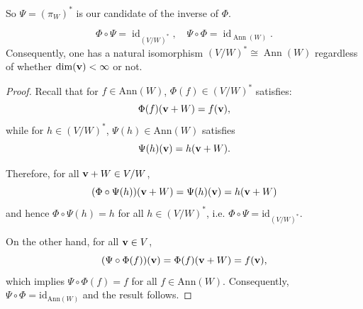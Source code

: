 So $\Psi = (\pi_W)^*$ is our candidate of the inverse of $\Phi$. 


\begin{theorem}
\[
\Phi \circ \Psi = \operatorname{id}_{(V/W)^*}, \quad \Psi \circ \Phi = \operatorname{id}_{\operatorname{Ann}(W)}.
\]
Consequently, one has a natural isomorphism $(V/W)^* \cong \operatorname{Ann}(W)$ regardless of whether $\dim({\bf v}) < \infty$ or not.
\end{theorem}
\begin{proof}
    Recall that for $f \in \mathrm{Ann}(W)$, $\Phi(f) \in (V/W)^*$ satisfies:
    $$\Phi(f)({\bf v}+W) = f({\bf v}),$$ 
    while for $h \in (V/W)^*$, $\Psi(h) \in \mathrm{Ann}(W)$ satisfies
    $$\Psi(h)({\bf v}) = h({\bf v}+W).$$

    Therefore, for all ${\bf v} +W \in V/W$,
    $$(\Phi \circ \Psi(h))({\bf v} + W) = \Psi(h)({\bf v}) = h({\bf v}+W)$$
    and hence $\Phi \circ \Psi(h) = h$ for all $h \in (V/W)^*$, i.e. $\Phi \circ \Psi = \mathrm{id}_{(V/W)^*}$.

    On the other hand, for all ${\bf v} \in V$,
    $$(\Psi \circ \Phi(f))({\bf v}) = \Phi(f)({\bf v} + W) = f({\bf v}),$$
    which implies $\Psi \circ \Phi(f) = f$ for all $f \in \mathrm{Ann}(W)$. Consequently, $\Psi \circ \Phi = \mathrm{id}_{\mathrm{Ann}(W)}$ and the result follows.
\end{proof}






